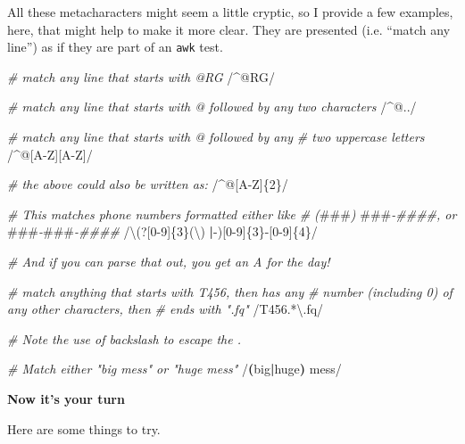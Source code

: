 \documentclass[]{krantz}
\makeatletter
\newenvironment{Shaded}{\begin{snugshade}}{\end{snugshade}}
\newcommand{\AlertTok}[1]{\textcolor[rgb]{0.33,0.33,0.33}{#1}}
\newcommand{\CommentTok}[1]{\textcolor[rgb]{0.37,0.37,0.37}{\textit{#1}}}
\newcommand{\DataTypeTok}[1]{\textcolor[rgb]{0.27,0.27,0.27}{#1}}
\newcommand{\ExtensionTok}[1]{#1}
\newcommand{\KeywordTok}[1]{\textcolor[rgb]{0.27,0.27,0.27}{\textbf{#1}}}
\newcommand{\NormalTok}[1]{#1}
\newenvironment{kframe}{%
\medskip{}
\setlength{\fboxsep}{.8em}
 \def\at@end@of@kframe{}%
 \ifinner\ifhmode%
  \def\at@end@of@kframe{\end{minipage}}%
  \begin{minipage}{\columnwidth}%
 \fi\fi%
 \def\FrameCommand##1{\hskip\@totalleftmargin \hskip-\fboxsep
 \colorbox{shadecolor}{##1}\hskip-\fboxsep
     \hskip-\linewidth \hskip-\@totalleftmargin \hskip\columnwidth}%
 \MakeFramed {\advance\hsize-\width
   \@totalleftmargin\z@ \linewidth\hsize
   \@setminipage}}%
 {\par\unskip\endMakeFramed%
 \at@end@of@kframe}
\renewenvironment{Shaded}{\begin{kframe}}{\end{kframe}}
\makeatother
\begin{document}
All these metacharacters might seem a little cryptic, so I provide a few
examples, here, that might help to make it more clear. They are presented
(i.e. ``match any line'') as if they are part of an \texttt{awk} test.

\begin{Shaded}
\begin{Highlighting}[]
\CommentTok{# match any line that starts with @RG}
\NormalTok{/^}\ExtensionTok{@RG/}

\CommentTok{# match any line that starts with @ followed by any two characters}
\NormalTok{/^}\ExtensionTok{@../}

\CommentTok{# match any line that starts with @ followed by any}
\CommentTok{# two uppercase letters}
\NormalTok{/^}\ExtensionTok{@}\NormalTok{[A-Z][A-Z]/}

\CommentTok{# the above could also be written as:}
\NormalTok{/^}\ExtensionTok{@}\NormalTok{[A-Z]}\DataTypeTok{\{2\}}\NormalTok{/}

\CommentTok{# This matches phone numbers formatted either like }
\CommentTok{# (}\AlertTok{###}\CommentTok{) }\AlertTok{###}\CommentTok{-####, or }\AlertTok{###}\CommentTok{-}\AlertTok{###}\CommentTok{-####}
\NormalTok{/}\DataTypeTok{\textbackslash{}(}\ExtensionTok{?}\NormalTok{[0-9]}\DataTypeTok{\{3\}}\NormalTok{(}\DataTypeTok{\textbackslash{})} \KeywordTok{|}\ExtensionTok{-}\NormalTok{)[}\ExtensionTok{0-9}\NormalTok{]}\DataTypeTok{\{3\}-[0-9]\{4\}}\NormalTok{/}

\CommentTok{# And if you can parse that out, you get an A for the day!}

\CommentTok{# match anything that starts with T456, then has any}
\CommentTok{# number (including 0) of any other characters, then}
\CommentTok{# ends with ".fq"}
\NormalTok{/}\ExtensionTok{T456.*}\NormalTok{\textbackslash{}.fq/}

\CommentTok{# Note the use of backslash to escape the .}

\CommentTok{# Match either "big mess" or "huge mess"}
\NormalTok{/}\KeywordTok{(}\ExtensionTok{big}\KeywordTok{|}\ExtensionTok{huge}\KeywordTok{)} \ExtensionTok{mess/}
\end{Highlighting}
\end{Shaded}

\textbf{Now it's your turn}

Here are some things to try.

\begin{Shaded}
\end{Shaded}
\end{document}
